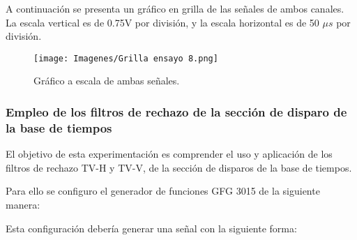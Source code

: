 A continuación se presenta un gráfico en grilla de las señales de ambos canales. La escala vertical es de 0.75V por división, y la escala horizontal es de 50 $\mu s$ por división.

\begin{figure}[H]
    \centering
        \texttt{[image: Imagenes/Grilla ensayo 8.png]}
    \caption{Gráfico a escala de ambas señales.}
\label{fig::TrenDePulsosOsc}
\end{figure}



\vspace{0.5cm}
\subsubsection{Empleo de los filtros de rechazo de la sección de disparo de la base de tiempos}
El objetivo de esta experimentación es comprender el uso y aplicación de los filtros de rechazo TV-H y TV-V, de la sección de disparos de la base de tiempos.

Para ello se configuro el generador de funciones GFG 3015 de la siguiente manera:

\begin{table}[H]
    \centering
        \def\tablename{Tabla} 
        \caption{Disposición de controles del generador}
        \label{tab:gen9}
\end{table}

Esta configuración debería generar una señal con la siguiente forma:

